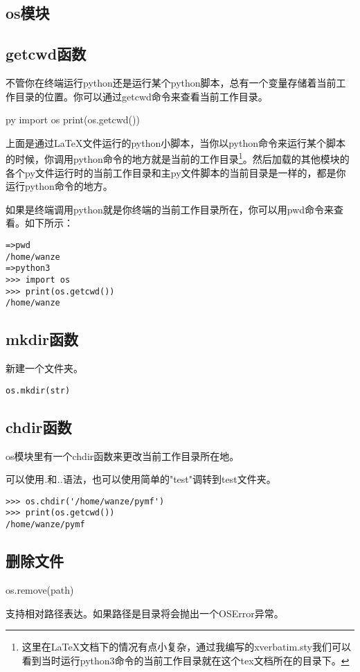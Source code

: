 \documentclass[12pt,oneside]{book}
\begin{document}
\begin{common-format}
\chapter{os模块}
\section{getcwd函数}
不管你在终端运行python还是运行某个python脚本，总有一个变量存储着当前工作目录的位置。你可以通过getcwd命令来查看当前工作目录。

\begin{xverbatim}[129]{py}
import os
print(os.getcwd())
\end{xverbatim}
上面是通过\LaTeX 文件运行的python小脚本，当你以python命令来运行某个脚本的时候，你调用python命令的地方就是当前的工作目录\footnote{这里在\LaTeX 文档下的情况有点小复杂，通过我编写的xverbatim.sty我们可以看到当时运行python3命令的当前工作目录就在这个tex文档所在的目录下。}。然后加载的其他模块的各个py文件运行时的当前工作目录和主py文件脚本的当前目录是一样的，都是你运行python命令的地方。

如果是终端调用python就是你终端的当前工作目录所在，你可以用pwd命令来查看。如下所示：
\begin{Verbatim}
=>pwd
/home/wanze
=>python3
>>> import os
>>> print(os.getcwd())
/home/wanze
\end{Verbatim}

\section{mkdir函数}
新建一个文件夹。
\begin{Verbatim}
os.mkdir(str)
\end{Verbatim}


\section{chdir函数}
os模块里有一个chdir函数来更改当前工作目录所在地。

可以使用\emph{.}和\emph{..}语法，也可以使用简单的"test"调转到test文件夹。
\begin{Verbatim}
>>> os.chdir('/home/wanze/pymf')
>>> print(os.getcwd())
/home/wanze/pymf
\end{Verbatim}

\section{删除文件}
os.remove(path)

支持相对路径表达。如果路径是目录将会抛出一个OSError异常。


\end{common-format}
\end{document}
